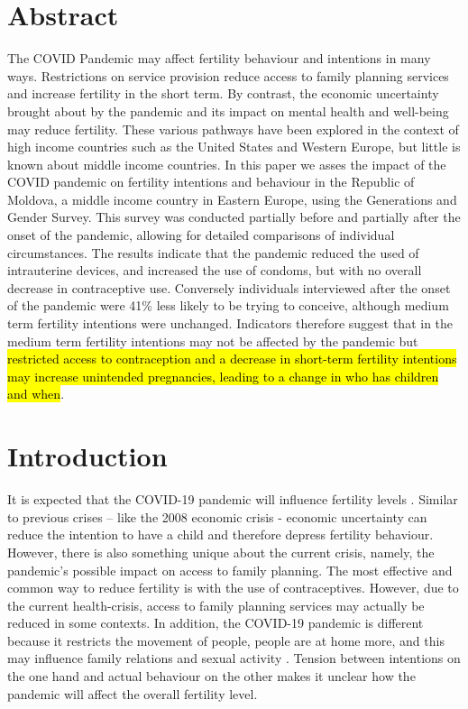 \documentclass[10pt,letterpaper]{article}
\begin{document}
\section*{Abstract}
The COVID Pandemic may affect fertility behaviour and intentions in many ways. Restrictions on service provision reduce access to family planning services and increase fertility in the short term. By contrast, the economic uncertainty brought about by the pandemic and its impact on mental health and well-being may reduce fertility. These various pathways have been explored in the context of high income countries such as the United States and Western Europe, but little is known about middle income countries. In this paper we asses the impact of the COVID pandemic on fertility intentions and behaviour in the Republic of Moldova, a middle income country in Eastern Europe, using the Generations and Gender Survey. This survey was conducted partially before and partially after the onset of the pandemic, allowing for detailed comparisons of individual circumstances. The results indicate that the pandemic reduced the used of intrauterine devices, and increased the use of condoms, but with no overall decrease in contraceptive use. Conversely individuals interviewed after the onset of the pandemic were 41\% less likely to be trying to conceive, although medium term fertility intentions were unchanged. Indicators therefore suggest that in the medium term fertility intentions may not be affected by the pandemic but \hl{restricted access to contraception and a decrease in short-term fertility intentions may increase unintended pregnancies, leading to a change in who has children and when}.

\linenumbers

\section*{Introduction}
It is expected that the COVID-19 pandemic will influence fertility levels \cite{lappegaard2020covid}. Similar to previous crises – like the 2008 economic crisis - economic uncertainty can reduce the intention to have a child and therefore depress fertility behaviour. However, there is also something unique about the current crisis, namely, the pandemic's possible impact on access to family planning. The most effective and common way to reduce fertility is with the use of contraceptives. However, due to the current health-crisis, access to family planning services may actually be reduced in some contexts. In addition, the COVID-19 pandemic is different because it restricts the movement of people, people are at home more, and this may influence family relations and sexual activity  \cite{settersten2020understanding}. Tension between intentions on the one hand and actual behaviour on the other makes it unclear how the pandemic will affect the overall fertility level.
\end{document}

